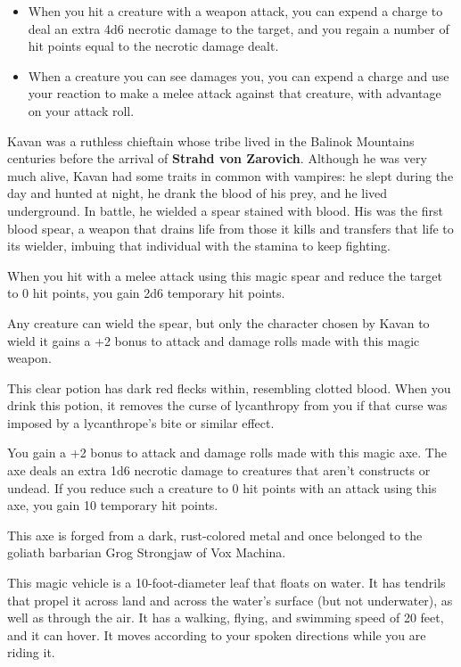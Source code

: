 \documentclass[10pt,a4paper,twoside,bg=print,twocolumn,openany,nodeprecatedcode]{dndbook}
\begin{document}
\begin{itemize}
\item When you hit a creature with a weapon attack, you can expend a charge to deal an extra 4d6 necrotic damage to the target, and you regain a number of hit points equal to the necrotic damage dealt.
\item When a creature you can see damages you, you can expend a charge and use your reaction to make a melee attack against that creature, with advantage on your attack roll.
\end{itemize}

Kavan was a ruthless chieftain whose tribe lived in the Balinok Mountains centuries before the arrival of \textbf{Strahd von Zarovich}. Although he was very much alive, Kavan had some traits in common with vampires: he slept during the day and hunted at night, he drank the blood of his prey, and he lived underground. In battle, he wielded a spear stained with blood. His was the first blood spear, a weapon that drains life from those it kills and transfers that life to its wielder, imbuing that individual with the stamina to keep fighting.

When you hit with a melee attack using this magic spear and reduce the target to 0 hit points, you gain 2d6 temporary hit points.

Any creature can wield the spear, but only the character chosen by Kavan to wield it gains a +2 bonus to attack and damage rolls made with this magic weapon.

This clear potion has dark red flecks within, resembling clotted blood. When you drink this potion, it removes the curse of lycanthropy from you if that curse was imposed by a lycanthrope's bite or similar effect.

You gain a +2 bonus to attack and damage rolls made with this magic axe. The axe deals an extra 1d6 necrotic damage to creatures that aren't constructs or undead. If you reduce such a creature to 0 hit points with an attack using this axe, you gain 10 temporary hit points.

This axe is forged from a dark, rust-colored metal and once belonged to the goliath barbarian Grog Strongjaw of Vox Machina.

This magic vehicle is a 10-foot-diameter leaf that floats on water. It has tendrils that propel it across land and across the water's surface (but not underwater), as well as through the air. It has a walking, flying, and swimming speed of 20 feet, and it can hover. It moves according to your spoken directions while you are riding it.
\end{document}
